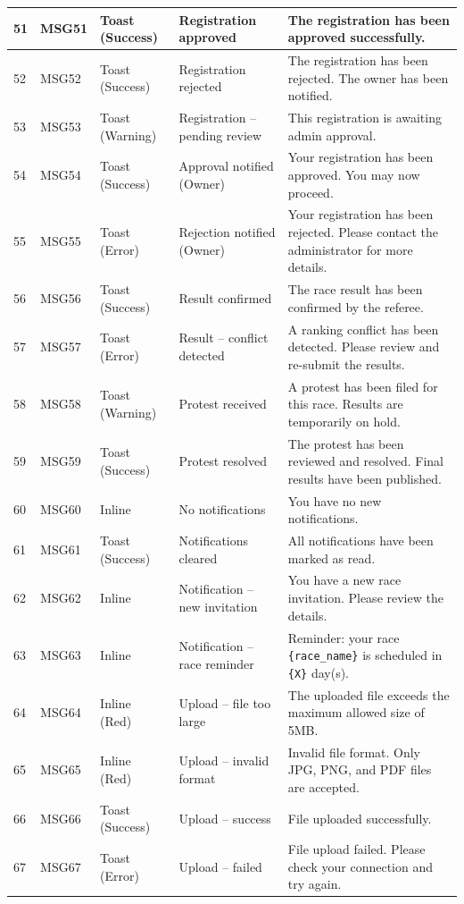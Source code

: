 \begin{longtable}{|p{}|p{}|p{}|p{}|p{}|}
51 & MSG51 & Toast (Success) & Registration approved & The registration has been approved successfully. \\
\hline
52 & MSG52 & Toast (Success) & Registration rejected & The registration has been rejected. The owner has been notified. \\
\hline
53 & MSG53 & Toast (Warning) & Registration -- pending review & This registration is awaiting admin approval. \\
\hline
54 & MSG54 & Toast (Success) & Approval notified (Owner) & Your registration has been approved. You may now proceed. \\
\hline
55 & MSG55 & Toast (Error) & Rejection notified (Owner) & Your registration has been rejected. Please contact the administrator for more details. \\
\hline

56 & MSG56 & Toast (Success) & Result confirmed & The race result has been confirmed by the referee. \\
\hline
57 & MSG57 & Toast (Error) & Result -- conflict detected & A ranking conflict has been detected. Please review and re-submit the results. \\
\hline
58 & MSG58 & Toast (Warning) & Protest received & A protest has been filed for this race. Results are temporarily on hold. \\
\hline
59 & MSG59 & Toast (Success) & Protest resolved & The protest has been reviewed and resolved. Final results have been published. \\
\hline

60 & MSG60 & Inline & No notifications & You have no new notifications. \\
\hline
61 & MSG61 & Toast (Success) & Notifications cleared & All notifications have been marked as read. \\
\hline
62 & MSG62 & Inline & Notification -- new invitation & You have a new race invitation. Please review the details. \\
\hline
63 & MSG63 & Inline & Notification -- race reminder & Reminder: your race \texttt{\{race\_name\}} is scheduled in \texttt{\{X\}} day(s). \\
\hline

64 & MSG64 & Inline (Red) & Upload -- file too large & The uploaded file exceeds the maximum allowed size of 5MB. \\
\hline
65 & MSG65 & Inline (Red) & Upload -- invalid format & Invalid file format. Only JPG, PNG, and PDF files are accepted. \\
\hline
66 & MSG66 & Toast (Success) & Upload -- success & File uploaded successfully. \\
\hline
67 & MSG67 & Toast (Error) & Upload -- failed & File upload failed. Please check your connection and try again. \\
\hline


\end{longtable}
